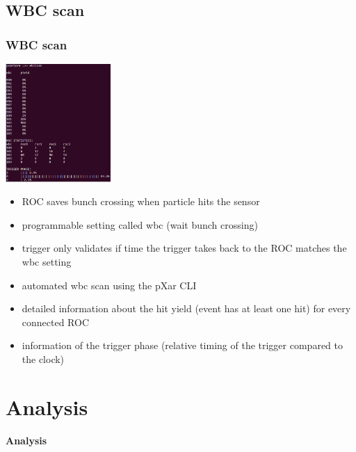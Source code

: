 \documentclass[9pt]{beamer}
\begin{document}
\subsection{WBC scan}
\begin{frame}
	\frametitle{WBC scan}
	\begin{center}
		\begin{minipage}{4.0cm}
			\centering
			\includegraphics[width=4.0cm]{Pics/wbcscan1}
		\end{minipage}
		\hspace*{2pt}
		\begin{minipage}[c][.7\textheight]{7cm}
			\begin{itemize}
				\setlength{\itemsep}{\fill}
				\item ROC saves bunch crossing when particle hits the sensor
				\item programmable setting called wbc (wait bunch crossing)
				\item trigger only validates if time the trigger takes back to the ROC matches the wbc setting
				\item automated wbc scan using the pXar CLI
				\item detailed information about the hit yield (event has at least one hit) for every connected ROC
				\item information of the trigger phase (relative timing of the trigger compared to the clock)
			\end{itemize}
		\end{minipage}\no\s
	\end{center}
\end{frame}
\section{Analysis}
\begin{frame}
	\begin{alertblock}{
		\begin{center}
			\Large{\textbf{Analysis}}
		\end{center}}
	\end{alertblock}
\end{frame}
\end{document}
